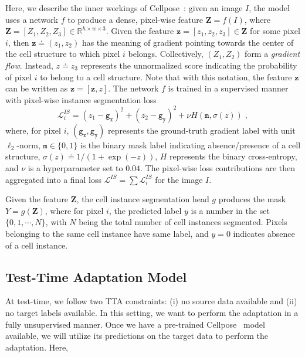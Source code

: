 Here, we describe the inner workings of Cellpose~\cite{stringer2021cellpose}: given an image $I$, the model uses a network $f$ to produce a dense, pixel-wise feature $\bm{Z} = f(I)$, where $ \bm{Z} = [Z_1, Z_2, Z_3] \in \mathbb{R}^{h \times w \times 3}$. Given the feature $\mathbf{z} = [z_1, z_2, z_3] \in \bm{Z}$ for some pixel $i$, then $\bm{z} \doteq (z_1, z_2)$ has the meaning of gradient pointing towards the center of the cell structure to which pixel $i$ belongs. Collectively, $(Z_1,Z_2)$ form a \emph{gradient flow}. Instead, $z \doteq z_3$ represents the unnormalized score indicating the probability of pixel $i$ to belong to a cell structure. Note that with this notation, the feature $\mathbf{z}$ can be written as $\mathbf{z} = [\bm{z}, z]$. The network $f$ is trained in a supervised manner with pixel-wise instance segmentation loss
\begin{equation}
  \mathcal{L}_i^{IS} = (z_1 - \mathtt{g_x})^2 + (z_2 - \mathtt{g_y})^2 + \nu H(\mathtt{m},\sigma(z))  \; ,
\end{equation}
where, for pixel $i$,  $(\mathtt{g_x}, \mathtt{g_y})$ represents the ground-truth gradient label with unit $\ell_2$-norm, $\mathtt{m} \in \{0, 1\}$ is the binary mask label indicating absence/presence of a cell structure, $\sigma(z) \doteq 1/(1+\exp(-z))$, $H$ represents the binary cross-entropy, and $\nu$ is a hyperparameter set to $0.04$. The pixel-wise loss contributions are then aggregated into a final loss $\mathcal{L}^{IS} = \sum \mathcal{L}_i^{IS}$ for the image $I$.


Given the feature $\bm{Z}$, the cell instance segmentation head $g$ produces the mask $Y = g(\bm{Z})$, where for pixel $i$, the predicted label $y$ is a number in the set $\{0, 1, \cdots, N \}$, with $N$ being the total number of cell instances segmented. Pixels belonging to the same cell instance have same label, and $y=0$ indicates absence of a cell instance. 


\subsection{Test-Time Adaptation Model}

At test-time, we follow two TTA constraints: (i) no source data available and (ii) no target labels available. In this setting, we want to perform the adaptation in a fully unsupervised manner. Once we have a pre-trained Cellpose~\cite{stringer2021cellpose} model available, we will utilize its predictions on the target data to perform the adaptation. Here,   


